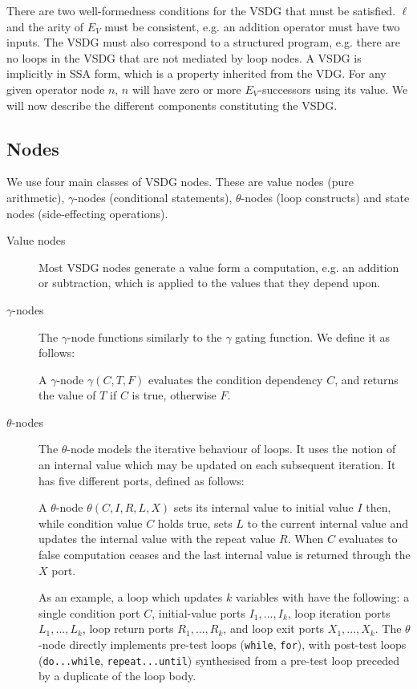 There are two well-formedness conditions for the VSDG that must be satisfied. $\ell$ and the arity of $E_{V}$ must be consistent, e.g. an addition operator must have two inputs. The VSDG must also correspond to a structured program, e.g. there are no loops in the VSDG that are not mediated by loop nodes. A VSDG is implicitly in SSA form, which is a property inherited from the VDG. For any given operator node $n$, $n$ will have zero or more $E_{V}$-successors using its value. We will now describe the different components constituting the VSDG.

\subsection{Nodes}

We use four main classes of VSDG nodes. These are value nodes (pure arithmetic), $\gamma$-nodes (conditional statements), $\theta$-nodes (loop constructs) and state nodes (side-effecting operations).

\begin{description}
\item[Value nodes] Most VSDG nodes generate a value form a computation, e.g. an addition or subtraction, which is applied to the values that they depend upon.
\item[$\gamma$-nodes] The $\gamma$-node functions similarly to the $\gamma$ gating function. We define it as follows:
\begin{definition}
A $\gamma$-node $\gamma(C,T,F)$ evaluates the condition dependency $C$, and returns the value of $T$ if $C$ is true, otherwise $F$.
\end{definition}
\item[$\theta$-nodes] The $\theta$-node models the iterative behaviour of loops. It uses the notion of an internal value which may be updated on each subsequent iteration. It has five different ports, defined as follows:
\begin{definition}
A $\theta$-node $\theta(C,I,R,L,X)$ sets its internal value to initial value $I$ then, while condition value $C$ holds true, sets $L$ to the current internal value and updates the internal value with the repeat value $R$. When $C$ evaluates to false computation ceases and the last internal value is returned through the $X$ port.
\end{definition}
As an example, a loop which updates $k$ variables with have the following: a single condition port $C$, initial-value ports $I_{1},...,I_{k}$, loop iteration ports $L_{1},...,L_{k}$, loop return ports $R_{1},...,R_{k}$, and loop exit ports $X_{1},...,X_{k}$. The $\theta$-node directly implements pre-test loops (\texttt{while}, \texttt{for}), with post-test loops (\texttt{do...while}, \texttt{repeat...until}) synthesised from a pre-test loop preceded by a duplicate of the loop body. %
\end{description}


